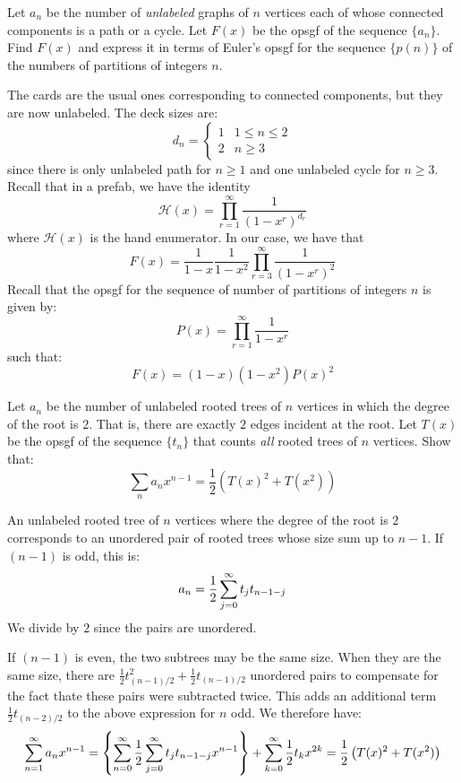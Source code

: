 \begin{exercise}
    Let $a_n$ be the number of \emph{unlabeled} graphs of $n$ vertices each of whose connected components is a path or a cycle. Let $F(x)$ be the opsgf of the sequence $\{a_n\}$. Find $F(x)$ and express it in terms of Euler's opsgf for the sequence $\{p(n)\}$ of the numbers of partitions of integers $n$.
\end{exercise}
\begin{solution}
    The cards are the usual ones corresponding to connected components, but they are now unlabeled. The deck sizes are:
    \[
        d_n = \begin{cases}
            1 & 1 \leq n \leq 2 \\
            2 & n \geq 3
        \end{cases}
    \]
    since there is only unlabeled path for $n \geq 1$ and one unlabeled cycle for $n \geq 3$. Recall that in a prefab, we have the identity
    \[
        \mathcal{H}(x) = \prod_{r=1}^\infty \frac{1}{(1-x^r)^{d_r}}
    \]
    where $\mathcal{H}(x)$ is the hand enumerator. In our case, we have that
    \[
        F(x) = \frac{1}{1-x} \frac{1}{1-x^2} \prod_{r=3}^\infty \frac{1}{(1-x^r)^2}
    \]
    Recall that the opsgf for the sequence of number of partitions of integers $n$ is given by:
    \[
        P(x) = \prod_{r=1}^\infty \frac{1}{1-x^r}
    \]
    such that:
    \[
        F(x) = (1-x)(1-x^2)P(x)^2
    \]
\end{solution}

\begin{exercise}
    Let $a_n$ be the number of unlabeled rooted trees of $n$ vertices in which the degree of the root is $2$. That is, there are exactly $2$ edges incident at the root. Let $T(x)$ be the opsgf of the sequence $\{t_n\}$ that counts \emph{all} rooted trees of $n$ vertices. Show that:
    \[
        \sum_n a_nx^{n-1} = \frac{1}{2}\left(T(x)^2 + T(x^2)\right)
    \]
\end{exercise}
\begin{solution}
    An unlabeled rooted tree of $n$ vertices where the degree of the root is $2$ corresponds to an unordered pair of rooted trees whose size sum up to $n-1$. If $(n-1)$ is odd, this is:
    \[
        a_n = \frac{1}{2} \bsum[j] t_j t_{n-1-j}
    \]
    We divide by $2$ since the pairs are unordered.
    
    If $(n-1)$ is even, the two subtrees may be the same size. When they are the same size, there are $\frac{1}{2}t_{(n-1)/2}^2 + \frac{1}{2}t_{(n-1)/2}$ unordered pairs to compensate for the fact thate these pairs were subtracted twice. This adds an additional term $\frac{1}{2}t_{(n-2)/2}$ to the above expression for $n$ odd. We therefore have:
    \[
        \sum_{n=1}^\infty a_nx^{n-1} = \left\{\bsum[n] \frac{1}{2} \bsum[j] t_j t_{n-1-j}x^{n-1}\right\} + \bsum[k]\frac{1}{2}t_kx^{2k} = \frac{1}{2}\left(T(x)^2 + T(x^2)\right)
    \]
\end{solution}

